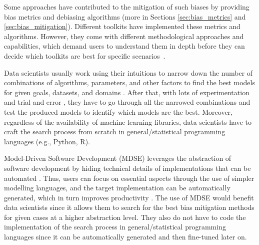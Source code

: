 \documentclass[sigconf]{acmart}
\begin{document}
	Some approaches have contributed to the mitigation of such biases by providing bias metrics and debiasing algorithms (more in Sections \ref{sec:bias_metrics} and \ref{sec:bias_mitigation}). 
	Different toolkits have implemented these metrics and algorithms.
	However, they come with different methodological approaches and capabilities, which demand users to understand them in depth before they can decide which toolkits are best for specific scenarios~\cite{lee2021landscape}.  
	
	Data scientists usually work using their intuitions to narrow down the number of combinations of algorithms, parameters, and other factors to find the best models for given goals, datasets, and domains \cite{muller2016introduction}. After that, with lots of experimentation and trial and error \cite{byrne2017development}, they have to go through all the narrowed combinations and test the produced models to identify which models are the best. Moreover, regardless of the availability of machine learning libraries, data scientists have to craft the search process from scratch in general/statistical programming languages (e.g., Python, R).
	
	Model-Driven Software Development (MDSE) leverages the abstraction of software development by hiding technical details of implementations that can be automated \cite{brambilla2017model}. Thus, users can focus on essential aspects through the use of simpler modelling languages, and the target implementation can be automatically generated, which in turn improves productivity \cite{volter2013model}. The use of MDSE would benefit data scientists since it allows them to search for the best bias mitigation methods for given cases at a higher abstraction level. They also do not have to code the implementation of the search process in general/statistical programming languages since it can be automatically generated and then fine-tuned later on. 
	
\end{document}
